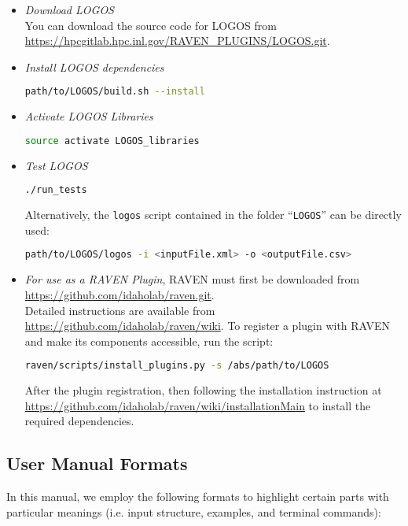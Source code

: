 \begin{itemize}
  \item \textit{Download LOGOS}
    \\ You can download the source code for LOGOS from \url{https://hpcgitlab.hpc.inl.gov/RAVEN_PLUGINS/LOGOS.git}.
  \item \textit{Install LOGOS dependencies}
	\begin{lstlisting}[language=bash]
	path/to/LOGOS/build.sh --install
	\end{lstlisting}
  \item \textit{Activate LOGOS Libraries}
  \begin{lstlisting}[language=bash]
  source activate LOGOS_libraries
  \end{lstlisting}
  \item \textit{Test LOGOS}
	\begin{lstlisting}[language=bash]
	./run_tests
	\end{lstlisting}
  	Alternatively, the \texttt{logos} script
    contained in the folder ``\texttt{LOGOS}'' can be directly used:
\begin{lstlisting}[language=bash]
path/to/LOGOS/logos -i <inputFile.xml> -o <outputFile.csv>
\end{lstlisting}
	\item \textit{For use as a RAVEN Plugin}, RAVEN must first be downloaded from
  \url{https://github.com/idaholab/raven.git}.
		\\ Detailed instructions are available from \url{https://github.com/idaholab/raven/wiki}.
    To register a plugin with RAVEN and make its components accessible, run the script:
    \begin{lstlisting}[language=bash]
  	raven/scripts/install_plugins.py -s /abs/path/to/LOGOS
  	\end{lstlisting}
    After the plugin registration, then following the installation instruction at
    \url{https://github.com/idaholab/raven/wiki/installationMain} to install the
    required dependencies.
\end{itemize}

\subsection{User Manual Formats}
In this manual, we employ the following formats to highlight certain parts with
particular meanings (i.e. input structure, examples, and terminal commands):

